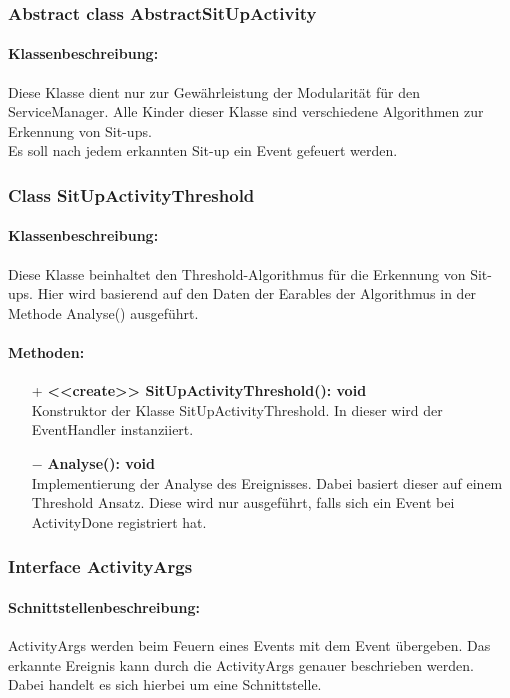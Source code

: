 \documentclass[a4paper,12pt]{article}
\begin{document}
	\subsubsection{Abstract class AbstractSitUpActivity}
	\paragraph{Klassenbeschreibung:}
	Diese Klasse dient nur zur Gewährleistung der Modularität für den ServiceManager. Alle Kinder dieser Klasse sind verschiedene Algorithmen zur Erkennung von Sit-ups.\\ Es soll nach jedem erkannten Sit-up ein Event gefeuert werden.
	
	\subsubsection{Class SitUpActivityThreshold}
	\paragraph{Klassenbeschreibung:}
	Diese Klasse beinhaltet den Threshold-Algorithmus für die Erkennung von Sit-ups. Hier wird basierend auf den Daten der Earables der Algorithmus in der Methode Analyse() ausgeführt.
	\paragraph{Methoden:}
	\begin{itemize}
		\item [+]\textbf{<<create>> SitUpActivityThreshold(): void}\\Konstruktor der Klasse SitUpActivityThreshold. In dieser wird der EventHandler instanziiert. 
		\item [$-$]\textbf{Analyse(): void}\\ Implementierung der Analyse des Ereignisses. Dabei basiert dieser auf einem Threshold Ansatz. Diese wird nur ausgeführt, falls sich ein Event bei ActivityDone registriert hat.
	\end{itemize}
		
	
	\subsubsection{Interface ActivityArgs}
	\paragraph{Schnittstellenbeschreibung:}
	ActivityArgs werden beim Feuern eines Events mit dem Event übergeben. Das erkannte Ereignis kann durch die ActivityArgs genauer beschrieben werden. Dabei handelt es sich hierbei um eine Schnittstelle. 
	
\end{document}
